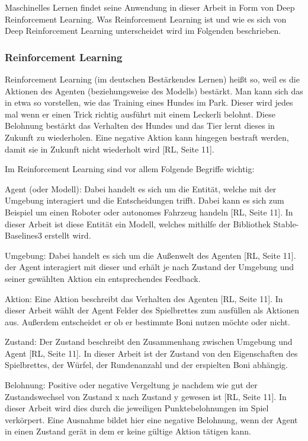  Maschinelles Lernen findet seine Anwendung in dieser Arbeit in Form von Deep Reinforcement Learning. Was Reinforcement Learning ist und wie es sich von Deep Reinforcement Learning unterscheidet wird im Folgenden beschrieben.
\subsubsection{Reinforcement Learning}
Reinforcement Learning (im deutschen Bestärkendes Lernen) heißt so, weil es die Aktionen des Agenten (beziehungsweise des Modells) bestärkt. Man kann sich das in etwa so vorstellen, wie das Training eines Hundes im Park. Dieser wird jedes mal wenn er einen Trick richtig ausführt mit einem Leckerli belohnt. Diese Belohnung bestärkt das Verhalten des Hundes und das Tier lernt dieses in Zukunft zu wiederholen. Eine negative Aktion kann hingegen bestraft werden, damit sie in Zukunft nicht wiederholt wird [RL, Seite 11].

Im Reinforcement Learning sind vor allem Folgende Begriffe wichtig:

Agent (oder Modell): Dabei handelt es sich um die Entität, welche mit der Umgebung interagiert und die Entscheidungen trifft. Dabei kann es sich zum Beispiel um einen Roboter oder autonomes Fahrzeug handeln [RL, Seite 11]. In dieser Arbeit ist diese Entität ein Modell, welches mithilfe der Bibliothek Stable-Baselines3 erstellt wird.

Umgebung: Dabei handelt es sich um die Außenwelt des Agenten [RL, Seite 11]. der Agent interagiert mit dieser und erhält je nach Zustand der Umgebung und seiner gewählten Aktion ein entsprechendes Feedback.

Aktion: Eine Aktion beschreibt das Verhalten des Agenten [RL, Seite 11]. In dieser Arbeit wählt der Agent Felder des Spielbrettes zum ausfüllen als Aktionen aus. Außerdem entscheidet er ob er bestimmte Boni nutzen möchte oder nicht.

Zustand: Der Zustand beschreibt den Zusammenhang zwischen Umgebung und Agent [RL, Seite 11]. In dieser Arbeit ist der Zustand von den Eigenschaften des Spielbrettes, der Würfel, der Rundenanzahl und der erspielten Boni abhängig.

Belohnung: Positive oder negative Vergeltung je nachdem wie gut der Zustandswechsel von Zustand x nach Zustand y gewesen ist [RL, Seite 11]. In dieser Arbeit wird dies durch die jeweiligen Punktebelohnungen im Spiel verkörpert. Eine Ausnahme bildet hier eine negative Belohnung, wenn der Agent in einen Zustand gerät in dem er keine gültige Aktion tätigen kann.

